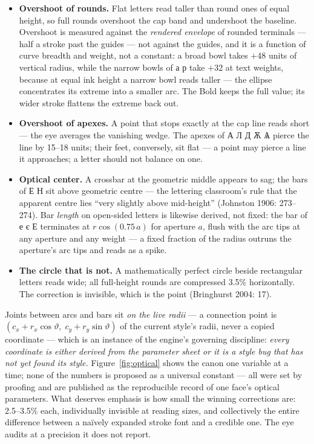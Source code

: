 \documentclass[11pt]{article}
\newcommand{\cz}[1]{{\chu #1}}
\begin{document}
\begin{itemize}
\item \textbf{Overshoot of rounds.} Flat letters read taller than round ones of equal height, so full rounds overshoot the cap band and undershoot the baseline. Overshoot is measured against the \emph{rendered envelope} of rounded terminals — half a stroke past the guides — not against the guides, and it is a function of curve breadth and weight, not a constant: a broad bowl takes $+$48 units of vertical radius, while the narrow bowls of \cz{а р} take $+$32 at text weights, because at equal ink height a narrow bowl reads taller — the ellipse concentrates its extreme into a smaller arc. The Bold keeps the full value; its wider stroke flattens the extreme back out.
\item \textbf{Overshoot of apexes.} A point that stops exactly at the cap line reads short — the eye averages the vanishing wedge. The apexes of \cz{А Л Д Ѫ Ѧ} pierce the line by 15--18 units; their feet, conversely, sit flat — a point may pierce a line it approaches; a letter should not balance on one.
\item \textbf{Optical center.} A crossbar at the geometric middle appears to sag; the bars of \cz{Е Н} sit above geometric centre — the lettering classroom's rule that the apparent centre lies ``very slightly above mid-height'' (Johnston 1906: 273--274). Bar \emph{length} on open-sided letters is likewise derived, not fixed: the bar of \cz{е є Е} terminates at $r\cos(0.75\,a)$ for aperture $a$, flush with the arc tips at any aperture and any weight — a fixed fraction of the radius outruns the aperture's arc tips and reads as a spike.
\item \textbf{The circle that is not.} A mathematically perfect circle beside rectangular letters reads wide; all full-height rounds are compressed 3.5\% horizontally. The correction is invisible, which is the point (Bringhurst 2004: 17).
\end{itemize}

Joints between arcs and bars sit \emph{on the live radii} — a connection point is $(c_x + r_x\cos\vartheta,\; c_y + r_y\sin\vartheta)$ of the current style's radii, never a copied coordinate — which is an instance of the engine's governing discipline: \emph{every coordinate is either derived from the parameter sheet or it is a style bug that has not yet found its style.} Figure~\ref{fig:optical} shows the canon one variable at a time; none of the numbers is proposed as a universal constant — all were set by proofing and are published as the reproducible record of one face's optical parameters. What deserves emphasis is how small the winning corrections are: 2.5--3.5\% each, individually invisible at reading sizes, and collectively the entire difference between a naïvely expanded stroke font and a credible one. The eye audits at a precision it does not report.
\end{document}
